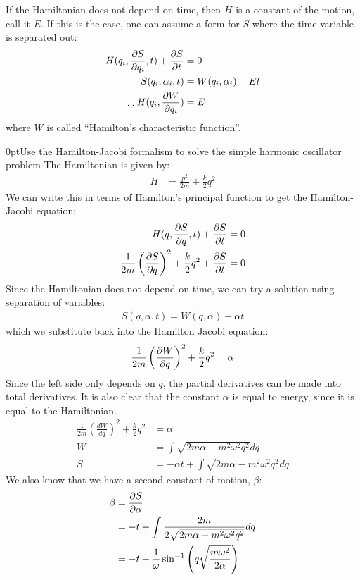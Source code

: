 If the Hamiltonian does not depend on time, then $H$ is a constant of the motion, call it $E$. If this is the case, one can assume a form for $S$ where the time variable is separated out:
\begin{align}
H(q_i,\frac{\partial S}{\partial q_i},t)+\frac{\partial S}{\partial t}&=0\nonumber\\
S(q_i,\alpha_i,t)&=W(q_i,\alpha_i)-Et\nonumber\\
\therefore H(q_i,\frac{\partial W}{\partial q_i})&=E
\end{align}
where $W$ is called ``Hamilton's characteristic function''.

\begin{example}{0pt}{Use the Hamilton-Jacobi formalism to solve the simple harmonic oscillator problem}{}
The Hamiltonian is given by:
\begin{align*}
H&=\frac{p^2}{2m}+\frac{k}{2}q^2
\end{align*}
We can write this in terms of Hamilton's principal function to get the Hamilton-Jacobi equation:
\begin{align*}
H(q,\frac{\partial S}{\partial q},t)+\frac{\partial S}{\partial t}&=0\\
\frac{1}{2m}\left(\frac{\partial S}{\partial q}\right)^2+\frac{k}{2}q^2+\frac{\partial S}{\partial t}&=0
\end{align*}
Since the Hamiltonian does not depend on time, we can try a solution using separation of variables:
\begin{align*}
S(q,\alpha,t)=W(q,\alpha)-\alpha t
\end{align*}
which we substitute back into the Hamilton Jacobi equation:
\begin{align*}
\frac{1}{2m}\left(\frac{\partial W}{\partial q}\right)^2+\frac{k}{2}q^2=\alpha
\end{align*}
Since the left side only depends on $q$, the partial derivatives can be made into total derivatives. It is also clear that the constant $\alpha$ is equal to energy, since it is equal to the Hamiltonian.
\begin{align*}
\frac{1}{2m}\left(\frac{dW}{dq}\right)^2+\frac{k}{2}q^2&=\alpha\\
W&=\int \sqrt{2m\alpha-m^2\omega^2q^2}dq\\
S&=-\alpha t+\int \sqrt{2m\alpha-m^2\omega^2q^2}dq
\end{align*}
We also know that we have a second constant of motion, $\beta$:
\begin{align*}
\beta &=\die{S}{\alpha}\\
&=-t+\int \frac{2m}{2\sqrt{2m\alpha-m^2\omega^2q^2}}dq\\
&=-t+\frac{1}{\omega}\sin^{-1}\left(q\sqrt{\frac{m\omega^2}{2\alpha}}  \right)

\end{align*}
\end{example}
